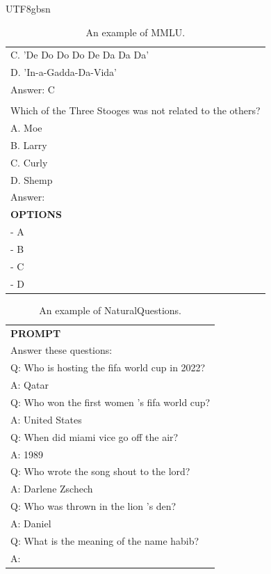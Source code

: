 \documentclass[11pt, a4paper, logo, copyright, nonumbering]{deepseek}
\begin{document}
\begin{CJK*}{UTF8}{gbsn}
\begin{table}[ht]
\begin{tabular}{p{12cm}}
C. 'De Do Do Do De Da Da Da'\\
D. 'In-a-Gadda-Da-Vida'\\
Answer: C\\
\\
Which of the Three Stooges was not related to the others?\\
A. Moe\\
B. Larry\\
C. Curly\\
D. Shemp\\
Answer:\\
\midrule
\textbf{OPTIONS}\\
- A\\
- B\\
- C\\
- D\\
\bottomrule
\end{tabular}
    \caption{\centering An example of MMLU.}
    \label{tab:mmlu_eval_format_example}
\end{table}

\begin{table}[ht]
    \centering \small
\begin{tabular}{p{12cm}}
\toprule
\textbf{PROMPT}\\
Answer these questions:\\
Q: Who is hosting the fifa world cup in 2022?\\
A: Qatar\\
Q: Who won the first women 's fifa world cup?\\
A: United States\\
Q: When did miami vice go off the air?\\
A: 1989\\
Q: Who wrote the song shout to the lord?\\
A: Darlene Zschech\\
Q: Who was thrown in the lion 's den?\\
A: Daniel\\
Q: What is the meaning of the name habib?\\
A:\\
\bottomrule
\end{tabular}
    \caption{\centering An example of NaturalQuestions.}
    \label{tab:naturalquestions_eval_format_example}
\end{table}


\end{CJK*}
\end{document}
